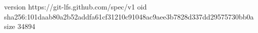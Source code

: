 version https://git-lfs.github.com/spec/v1
oid sha256:101daab80a2b52addfa61cf31210c91048ac9aee3b7828d337dd29575730bb0a
size 34894
